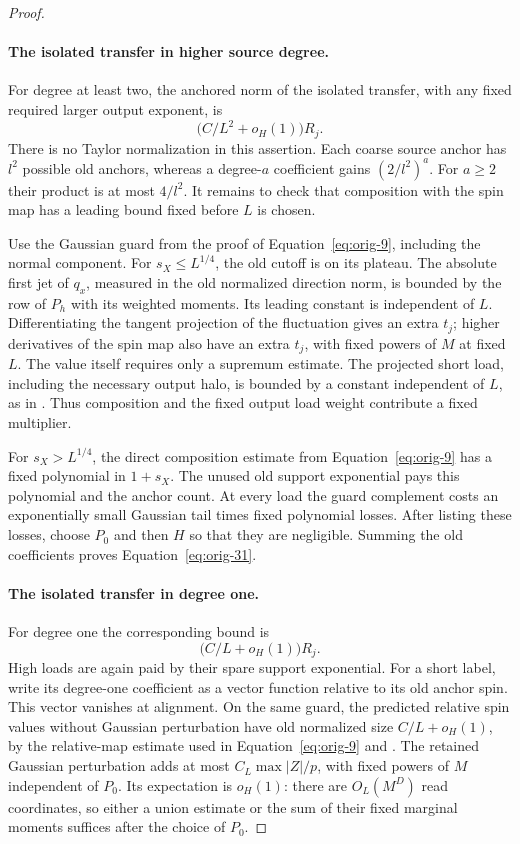 \begin{proof}
\paragraph{The isolated transfer in higher source degree.}
For degree at least two, the anchored norm of the isolated
transfer, with any fixed required larger output exponent, is
\begin{equation}
 \bigl(C/L^2+o_H(1)\bigr)R_j.
 \label{eq:orig-31}
\end{equation}
There is no Taylor normalization in this assertion.  Each coarse
source anchor has $l^2$ possible old anchors, whereas a degree-$a$
coefficient gains $(2/l^2)^a$.  For $a\ge2$ their product is at
most $4/l^2$.  It remains to check that composition with the spin
map has a leading bound fixed before $L$ is chosen.

Use the Gaussian guard from the proof of
Equation~\eqref{eq:orig-9}, including the normal component.  For
$s_X\le L^{1/4}$, the old cutoff is on its plateau.  The absolute
first jet of $q_x$, measured in the old normalized direction norm,
is bounded by the row of $P_h$ with its weighted moments.  Its
leading constant is independent of $L$.  Differentiating the
tangent projection of the fluctuation gives an extra $t_j$;
higher derivatives of the spin map also have an extra $t_j$,
with fixed powers of $M$ at fixed $L$.  The value itself requires
only a supremum estimate.  The projected short load, including
the necessary output halo, is bounded by a constant independent
of $L$, as in .  Thus composition and
the fixed output load weight contribute a fixed multiplier.

For $s_X>L^{1/4}$, the direct composition estimate from
Equation~\eqref{eq:orig-9} has a fixed polynomial in $1+s_X$.
The unused old support exponential pays this polynomial and the
anchor count.  At every load the guard complement costs an
exponentially small Gaussian tail times fixed polynomial losses.
After listing these losses, choose $P_0$ and then $H$ so that they
are negligible.  Summing the old coefficients proves
Equation~\eqref{eq:orig-31}.

\paragraph{The isolated transfer in degree one.}
For degree one the corresponding bound is
\begin{equation}
 \bigl(C/L+o_H(1)\bigr)R_j.
 \label{eq:orig-32}
\end{equation}
High loads are again paid by their spare support exponential.
For a short label, write its degree-one coefficient as a vector
function relative to its old anchor spin.  This vector vanishes
at alignment.  On the same guard, the predicted relative spin
values without Gaussian perturbation have old normalized size
$C/L+o_H(1)$, by the relative-map estimate used in
Equation~\eqref{eq:orig-9} and .
The retained Gaussian perturbation adds at most
$C_L\max|Z|/p$, with fixed powers of $M$ independent of $P_0$.
Its expectation is $o_H(1)$: there are $O_L(M^D)$ read
coordinates, so either a union estimate or the sum of their
fixed marginal moments suffices after the choice of $P_0$.


\end{proof}
